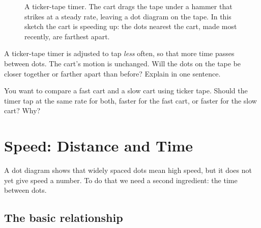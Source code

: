 \documentclass[11pt,twoside,openany]{book}
\newcounter{check}[chapter]
\begin{document}
\begin{figure}[htb]
\centering
{}
\caption{A ticker-tape timer. The cart drags the tape under a hammer that strikes at a steady rate, leaving a dot diagram on the tape. In this sketch the cart is speeding up: the dots nearest the cart, made most recently, are farthest apart.}
\label{fig:ticker}
\end{figure}

\begin{checkbox}
A ticker-tape timer is adjusted to tap \emph{less} often, so that more time passes between dots. The cart's motion is unchanged. Will the dots on the tape be closer together or farther apart than before? Explain in one sentence.
\end{checkbox}

\begin{checkbox}
You want to compare a fast cart and a slow cart using ticker tape. Should the timer tap at the same rate for both, faster for the fast cart, or faster for the slow cart? Why?
\end{checkbox}

\section{Speed: Distance and Time}

A dot diagram shows that widely spaced dots mean high speed, but it does not yet give speed a number. To do that we need a second ingredient: the time between dots.

\subsection{The basic relationship}
\end{document}
